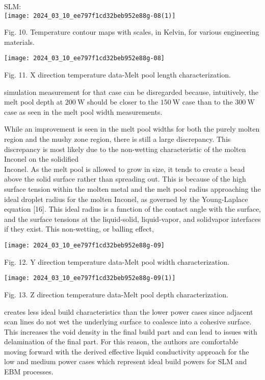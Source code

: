 \documentclass[10pt]{article}
\begin{document}
SLM:\\
\texttt{[image: 2024\_03\_10\_ee797f1cd32beb952e88g-08(1)]}

Fig. 10. Temperature contour maps with scales, in Kelvin, for various engineering materials.

\begin{center}
\texttt{[image: 2024\_03\_10\_ee797f1cd32beb952e88g-08]}
\end{center}

Fig. 11. X direction temperature data-Melt pool length characterization.

simulation measurement for that case can be disregarded because, intuitively, the melt pool depth at $200 \mathrm{~W}$ should be closer to the $150 \mathrm{~W}$ case than to the $300 \mathrm{~W}$ case as seen in the melt pool width measurements.

While an improvement is seen in the melt pool widths for both the purely molten region and the mushy zone region, there is still a large discrepancy. This discrepancy is most likely due to the non-wetting characteristic of the molten Inconel on the solidified\\
Inconel. As the melt pool is allowed to grow in size, it tends to create a bead above the solid surface rather than spreading out. This is because of the high surface tension within the molten metal and the melt pool radius approaching the ideal droplet radius for the molten Inconel, as governed by the Young-Laplace equation [16]. This ideal radius is a function of the contact angle with the surface, and the surface tensions at the liquid-solid, liquid-vapor, and solidvapor interfaces if they exist. This non-wetting, or balling effect,

\begin{center}
\texttt{[image: 2024\_03\_10\_ee797f1cd32beb952e88g-09]}
\end{center}

Fig. 12. Y direction temperature data-Melt pool width characterization.

\begin{center}
\texttt{[image: 2024\_03\_10\_ee797f1cd32beb952e88g-09(1)]}
\end{center}

Fig. 13. $\mathrm{Z}$ direction temperature data-Melt pool depth characterization.

creates less ideal build characteristics than the lower power cases since adjacent scan lines do not wet the underlying surface to coalesce into a cohesive surface. This increases the void density in the final build part and can lead to issues with delamination of the final part. For this reason, the authors are comfortable moving forward with the derived effective liquid conductivity approach for the low and medium power cases which represent ideal build powers for SLM and EBM processes.
\end{document}
